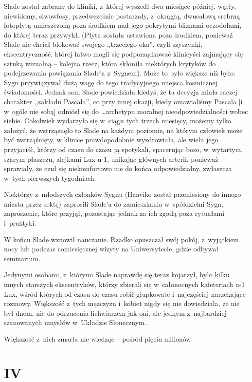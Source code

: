 \documentclass[oneside,polish,11pt,rmheadings]{mwbk}
\begin{document}
Slade został zabrany do kliniki, z~której wyszedł dwa miesiące później, wątły, niewidomy, siwowłosy, przedwcześnie postarzały, z~okrągłą, dwucalową srebrną fotopłytą umieszczoną poza środkiem nad jego pokrytymi bliznami oczodołami, do której teraz przywykł. (Płyta została ustawiona poza środkiem, ponieważ Slade nie chciał blokować swojego ,,trzeciego oka'', czyli szyszynki, ekscentryczność, której łatwo mogli się podporządkować klinicyści zajmujący się sztuką wizualną -- kolejna rzecz, która skłoniła niektórych krytyków do podejrzewania powiązania Slade'a z~Sygnem). Może to było większe niż było: Sygn przywiązywał dużą wagę do tego tradycyjnego miejsca kosmicznej świadomości. Jednak sam Slade powiedziała kiedyś, że ta decyzja miała raczej charakter ,,zakładu Pascala'', co przy innej okazji, kiedy omawialiśmy Pascala [i w~ogóle nie sobą] odniósł się do \ldots  archetypu moralnej nieodpowiedzialności wobec siebie. Cokolwiek wydarzyło się w~ciągu tych trzech miesięcy, możemy tylko założyć, że wstrząsnęło to Slade na każdym poziomie, na którym człowiek może być wstrząśnięty, w klinice prawdopodobnie wyzdrowiała, ale wielu jego przyjaciół, którzy od czasu do czasu ją spotykali, spacerując boso, w~wytartym, szarym płaszczu, alejkami Lux u-1, unikając głównych arterii, ponieważ sprawiały, że czuł się niekomfortowo nie do końca odpowiedzialny, zwłaszcza w~tych pierwszych tygodniach. 

Niektórzy z~młodszych członków Sygnu (Haaviko został przeniesiony do innego miasta przez sektę) zaprosili Slade'a do zamieszkania w~spółdzielni Sygn, zaproszenie, które przyjął, pozostając jednak za ich zgodą poza rytuałami i~praktyki. 

W końcu Slade wznowił nauczanie. Rzadko opuszczał swój pokój, z~wyjątkiem nocy lub podczas comiesięcznej wizyty na Uniwersytecie, gdzie odbywał seminarium. 

Jedynymi osobami, z~którymi Slade naprawdę się teraz kojarzył, było kilku innych starszych ekscentryków, którzy zbierali się w~całonocnych kafeteriach u-1 Lux, wśród których od czasu do czasu robił głupkowate i~najczęściej narzekające rozmowy. Większość z~tych mężczyzn i~kobiet nigdy się nie dowiedziała, że nie był dnem, nie do odrzucenia lichwiarzem jak oni, ale jednym z~najbardziej szanowanych umysłów w~Układzie Słonecznym. 

Większość z~nich zmarła nie wiedząc -- pośród pięciu milionów. 

\section*{IV}
\end{document}
